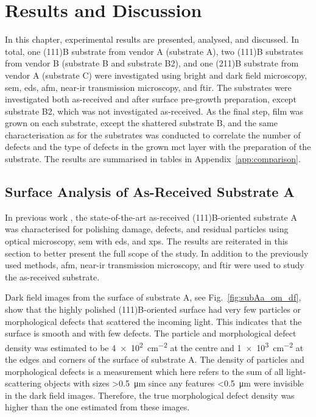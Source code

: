 \chapter{Results and Discussion}\label{ch:results-and-discussion}
In this chapter, experimental results are presented, analysed, and discussed. In total, one (111)B substrate from vendor A (substrate A), two (111)B substrates from vendor B (substrate B and substrate B2), and one (211)B substrate from vendor A (substrate C) were investigated using bright and dark field microscopy, \ac{sem}, \ac{eds}, \ac{afm}, near-\ac{ir} transmission microscopy, and \ac{ftir}. The substrates were investigated both as-received and after surface pre-growth preparation, except substrate B2, which was not investigated as-received. As the final step,  film was grown on each substrate, except the shattered substrate B, and the same characterisation as for the substrates was conducted to correlate the number of defects and the type of defects in the grown \ac{mct} layer with the preparation of the substrate. The results are summarised in tables in Appendix~\ref{app:comparison}.
\section{Surface Analysis of As-Received Substrate A}\label{sec:subAa}
In previous work \citep{lauten2017characterisation}, the state-of-the-art as-received (111)B-oriented substrate A was characterised for polishing damage, defects, and residual particles using optical microscopy, \ac{sem} with \ac{eds}, and \ac{xps}. The results are reiterated in this section to better present the full scope of the study. In addition to the previously used methods, \ac{afm}, near-\ac{ir} transmission microscopy, and \ac{ftir} were used to study the as-received substrate.

Dark field images from the surface of substrate A, see Fig.~\ref{fig:subAa_om_df}, show that the highly polished (111)B-oriented surface had very few particles or morphological defects that scattered the incoming light. This indicates that the surface is smooth and with few defects. The particle and morphological defect density was estimated to be \SI{4e2}{\centi\metre^{-2}} at the centre and \SI{1e3}{\centi\metre^{-2}} at the edges and corners of the surface of substrate A. The density of particles and morphological defects is a measurement which here refers to the sum of all light-scattering objects with sizes \SI{>0.5}{\micro\metre} since any features \SI{<0.5}{\micro\metre} were invisible in the dark field images. Therefore, the true morphological defect density was higher than the one estimated from these images.

